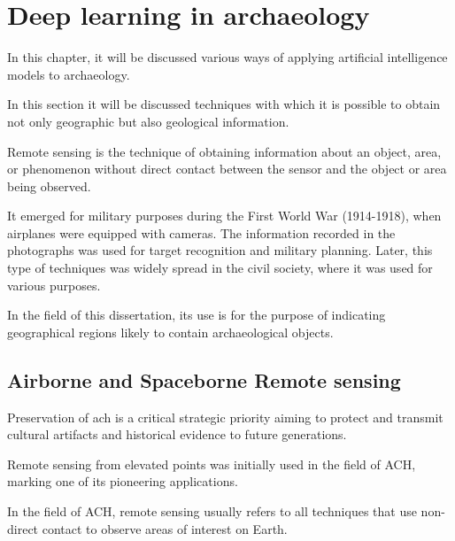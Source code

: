 

\chapter{Deep learning in archaeology}

\begin{introduction}
In this chapter, it will be discussed various ways of applying artificial intelligence models to archaeology.
\end{introduction}
In this section it will be discussed techniques with which it is possible to obtain not only geographic but also geological information. 

Remote sensing is the technique of obtaining information about an object, area, or phenomenon without direct contact between the sensor and the object or area being observed.

It emerged for military purposes during the First World War (1914-1918), when airplanes were equipped with cameras. The information recorded in the photographs was used for target recognition and military planning.
Later, this type of techniques was widely spread in the civil society, where it was used for various purposes. 

In the field of this dissertation, its use is for the purpose of indicating geographical regions likely to contain archaeological objects.



\section{Airborne and Spaceborne Remote sensing}

Preservation of \ac{ach} is a critical strategic priority aiming to protect and transmit cultural artifacts and historical evidence to future generations.

Remote sensing from elevated points was initially used in the field of ACH\cite{asmr}, marking one of its pioneering applications.

In the field of ACH, remote sensing usually refers to all techniques that use non-direct contact to observe areas of interest on Earth.

